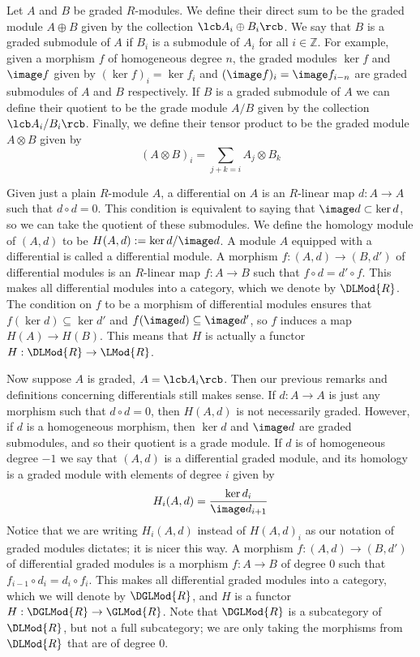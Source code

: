 Let $A$ and $B$ be graded $R$-modules. We define their direct sum to be the graded module $A \oplus B$ given by the collection $\lcb A_i \oplus B_i \rcb$. We say that $B$ is a graded submodule of $A$ if $B_i$ is a submodule of $A_i$ for all $i \in \mathbb Z$. For example, given a morphism $f$ of homogeneous degree $n$, the graded modules $\ker f$ and $\image f$ given by $(\ker f)_i = \ker f_i$ and $(\image f)_i = \image f_{i-n}$ are graded submodules of $A$ and $B$ respectively. If $B$ is a graded submodule of $A$ we can define their quotient to be the grade module $A/B$ given by the collection $\lcb A_i / B_i \rcb$. Finally, we define their tensor product to be the graded module $A \otimes B$ given by
\[ (A \otimes B)_i = \sum_{j+k=i} A_j \otimes B_k \]

Given just a plain $R$-module $A$, a differential on $A$ is an $R$-linear map $d : A \rightarrow A$ such that $d \circ d = 0$. This condition is equivalent to saying that $\image d \subset \ker d$, so we can take the quotient of these submodules. We define the homology module of $(A,d)$ to be $H(A,d) := \ker d / \image d$. A module $A$ equipped with a differential is called a differential module. A morphism $f : (A,d) \rightarrow (B,d')$ of differential modules is an $R$-linear map $f : A \rightarrow B$ such that $f \circ d = d' \circ f$. This makes all differential modules into a category, which we denote by $\DLMod{R}$. The condition on $f$ to be a morphism of differential modules ensures that $f(\ker d) \subseteq \ker d'$ and $f(\image d) \subseteq \image d'$, so $f$ induces a map $H(A) \rightarrow H(B)$. This means that $H$ is actually a functor $H : \DLMod{R} \rightarrow \LMod{R}$.

Now suppose $A$ is graded, $A = \lcb A_i \rcb$. Then our previous remarks and definitions concerning differentials still makes sense. If $d : A \rightarrow A$ is just any morphism such that $d \circ d = 0$, then $H(A,d)$ is not necessarily graded. However, if $d$ is a homogeneous morphism, then $\ker d$ and $\image d$ are graded submodules, and so their quotient is a grade module. If $d$ is of homogeneous degree $-1$ we say that $(A,d)$ is a differential graded module, and its homology is a graded module with elements of degree $i$ given by
\[ H_i(A,d) = \frac{\ker d_i}{\image d_{i+1}} \]
Notice that we are writing $H_i(A,d)$ instead of $H(A,d)_i$ as our notation of graded modules dictates; it is nicer this way. A morphism $f : (A,d) \rightarrow (B,d')$ of differential graded modules is a morphism $f : A \rightarrow B$ of degree 0 such that $f_{i-1} \circ d_i = d_i \circ f_i$. This makes all differential graded modules into a category, which we will denote by $\DGLMod{R}$, and $H$ is a functor $H : \DGLMod{R} \rightarrow \GLMod{R}$. Note that $\DGLMod{R}$ is a subcategory of $\DLMod{R}$, but not a full subcategory; we are only taking the morphisms from $\DLMod{R}$ that are of degree 0.

